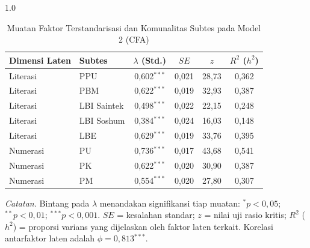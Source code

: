 \begin{table}[H]
    \centering
    \caption{Muatan Faktor Terstandarisasi dan Komunalitas Subtes pada Model 2 (CFA)}
    \label{tab:factor_loadings}
    \begin{spacing}{1.0}
    \begin{tabular}{llcccc}
        \toprule
        Dimensi Laten & Subtes & $\lambda$ (Std.) & $SE$ & $z$ & $R^2$ ($h^2$) \\
        \midrule
        Literasi        & PPU          & 0,602$^{***}$ & 0,021 & 28,73 & 0,362 \\
        Literasi        & PBM          & 0,622$^{***}$ & 0,019 & 32,93 & 0,387 \\
        Literasi        & LBI Saintek  & 0,498$^{***}$ & 0,022 & 22,15 & 0,248 \\
        Literasi        & LBI Soshum   & 0,384$^{***}$ & 0,024 & 16,03 & 0,148 \\
        Literasi        & LBE          & 0,629$^{***}$ & 0,019 & 33,76 & 0,395 \\
        Numerasi        & PU           & 0,736$^{***}$ & 0,017 & 43,68 & 0,541 \\
        Numerasi        & PK           & 0,622$^{***}$ & 0,020 & 30,90 & 0,387 \\
        Numerasi        & PM           & 0,554$^{***}$ & 0,020 & 27,80 & 0,307 \\
        \bottomrule
    \end{tabular}
    \end{spacing}
    \vspace{2mm}
    \begin{flushleft}
    \footnotesize\textit{Catatan.} Bintang pada $\lambda$ menandakan signifikansi tiap muatan: $^{*}p < 0,05$; $^{**}p < 0,01$; $^{***}p < 0,001$. $SE$ = kesalahan standar; $z$ = nilai uji rasio kritis; $R^2$ ($h^2$) = proporsi varians yang dijelaskan oleh faktor laten terkait. Korelasi antarfaktor laten adalah $\phi = 0,813$$^{***}$.
    \end{flushleft}
\end{table}
